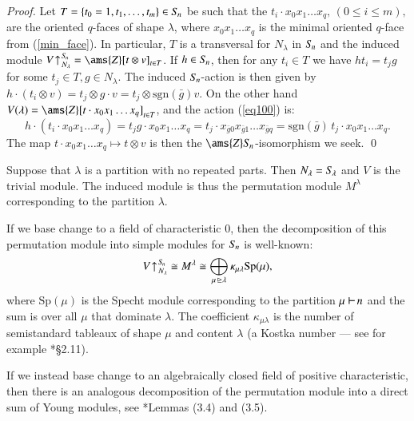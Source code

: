 \documentclass[matann2]{svjour1}
\def\Z{\ams{Z}}
\def\symn{S_{\kern-1pt n}}
\def\Sp{\mathrm{Sp}}
\def\partition{\,\,\begin{tikzpicture}
\draw[line width=0.7pt](0,0)--(0,0.2);
\draw[line width=0.7pt](0,0.1)--(0.175,0.1);
\end{tikzpicture}\,}
\newcommand{\Sym}[1]{S_{\kern-1pt {#1}}}
\begin{document}
\begin{proof}
  Let $T=\{t_0=1,t_1,\ldots, t_m\}\in\Sym{n}$ be such that the
  $t_i\cdot x_0x_1\ldots x_q,\, (0\leq i\leq m),$ are the oriented
  $q$-faces of shape $\lambda$, where $x_0x_1\ldots x_q$ is the minimal
  oriented $q$-face from (\ref{min_face}). In particular,
  $T$ is a transversal
  for $N_\lambda$ in $\Sym{n}$ and the induced module
$V\kern1pt{\uparrow^{\kern1pt\Sym{n}}_{\kern1ptN_\lambda}}=\Z[t\otimes
v]_{t\in T}$. 
If
$h\in\Sym{n}$,
then for any $t_i\in T$ we have $ht_i=t_jg$ for
some $t_j\in T,g\in N_\lambda$. 
The induced $\Sym{n}$-action is then given by
$h\cdot(t_i\otimes v)=t_j\otimes g\cdot v=t_j\otimes
\text{sgn}(\bar{g}) v$. On the other hand $V(\lambda)=
\Z[t\cdot x_0x_1\ldots x_q]_{t\in T}$,
and the action
(\ref{eq100}) is:
$$
h\cdot(t_i\cdot x_0x_1\ldots x_q)=t_jg\cdot x_0x_1\ldots x_q
=t_j\cdot x_{\bar{g} 0}x_{\bar{g} 1}\ldots x_{\bar{g}q}
=\text{sgn}(\bar{g})\, t_j\cdot x_0x_1\ldots x_q.
$$
The map $t\cdot x_0x_1\ldots x_q\mapsto t\otimes v$ is then the
$\Z\symn$-isomorphism we seek.
\qed
\end{proof}

\begin{remark}\label{rem:kostka}
Suppose that $\lambda$ is a partition with no repeated parts.
Then $N_\lambda = \Sym{\lambda}$ and  $V$ is 
the trivial module.
The induced module
is thus
the permutation module $M^\lambda$ 
corresponding to the partition $\lambda$.

If we base change to a field of characteristic $0$, then the 
decomposition of this permutation module into simple 
modules for $\symn$ is well-known: 
\begin{equation}\label{eq:kostka}
V\kern1pt{\uparrow^{\kern1pt\Sym{n}}_{\kern1ptN_\lambda}}\cong
M^\lambda\cong\bigoplus_{\mu\,\unrhd\lambda} \kappa_{\mu\lambda}\Sp(\mu),
\end{equation}
where $\Sp(\mu)$ is the Specht module corresponding to
the partition $\mu\partition n$ and the sum is over all $\mu$
that dominate $\lambda$. The coefficient $\kappa_{\mu\lambda}$ is the
number of  
semistandard tableaux of shape $\mu$ and content $\lambda$ (a Kostka
number ---  
see for example \cite{MR1824028}*{\S 2.11}).

If we instead base change to an algebraically closed field of positive 
characteristic, then there is an analogous decomposition of 
the permutation module into a direct sum of Young modules,
see \cite{donkin}*{Lemmas (3.4) and (3.5)}.
\end{remark}
\end{document}

